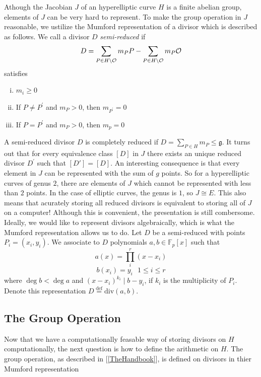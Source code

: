 Athough the Jacobian $J$ of an hyperelliptic curve $H$ is a finite abelian group, elements of $J$ can be very hard to represent. To make the group operation in $J$ reasonable, we ustilize the Mumford representation of a divisor which is described as follows. We call a divisor $D$ \textit{semi-reduced} if 
$$D = \sum_{P\in H \backslash \mathcal{O}} m_PP - \sum_{P\in H \backslash \mathcal{O}}m_P\mathcal{O}$$ satisfies  
\begin{enumerate}[(i)]
	\item $m_i \geq 0$
	\item If $P \neq P^{\prime}$ and $m_P> 0$, then $m_{P^\prime} = 0$
	\item If $P=P^\prime $ and $m_P> 0$, then $m_p = 0$
\end{enumerate} 
A semi-reduced divisor $D$ is completely reduced if $D= \sum_{P\in H}m_P \leq \mathfrak{g}$. It turns out that for every equivalence class $[D]$ in $J$ there exists an unique reduced divisor $D^\prime$ such that $[D\prime] = [D]$. An interesting consequence is that every element in $J$ can be represented with the sum of $\mathfrak{}g$ points. So for a hyperelliptic curves of genus $2$, there are elements of $J$ which cannot be represented with less than $2$ points. In the case of elliptic curves, the genus is $1$, so $J \cong E$.  This also means that acurately storing all reduced divisors is equivalent to storing all of $J$ on a computer! Although this is convenient, the presentation is still combersome. Ideally, we would like to represent divisors algebraically, which is what the Mumford representation allows us to do. Let $D$ be a semi-reduced with points $P_i = (x_i,y_i)$. We associate to $D$ polynomials $a,b \in \mathbb{F}_p[x]$ such that $$a(x) = \prod^r_i (x - x_i) $$ $$ b(x_i) = y_i \text{ } 1 \leq i \leq r $$ where $\deg b < \deg a$ and $(x - x_i)^{k_i} \mid b - y_i$, if $k_i$ is the multiplicity of $P_i$. Denote this representation $D \stackrel{\text{def}}{=} \text{div}(a,b)$. 

\subsection{The Group Operation}



Now that we have a computationally feasable way of storing divisors on $H$ computationally, the next question is how to define the arithmetic on $H$. The group operation, as described in [\ref{TheHandbook}], is defined on divisors in thier Mumford representation  \\ 	

